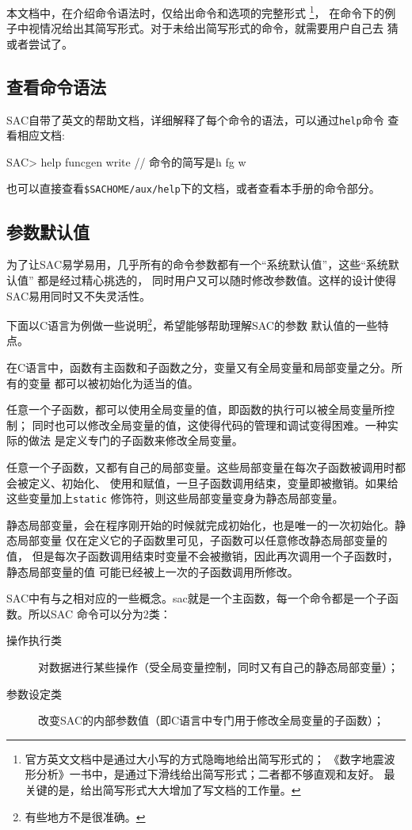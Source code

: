 本文档中，在介绍命令语法时，仅给出命令和选项的完整形式
\footnote{官方英文文档中是通过大小写的方式隐晦地给出简写形式的；
《数字地震波形分析》一书中，是通过下滑线给出简写形式；二者都不够直观和友好。
最关键的是，给出简写形式大大增加了写文档的工作量。}，
在命令下的例子中视情况给出其简写形式。对于未给出简写形式的命令，就需要用户自己去
猜或者尝试了。

\subsection{查看命令语法}
SAC自带了英文的帮助文档，详细解释了每个命令的语法，可以通过\lstinline{help}命令
查看相应文档:
\begin{SACCode}
SAC> help funcgen write   // 命令的简写是h fg w
\end{SACCode}
也可以直接查看\lstinline{$SACHOME/aux/help}下的文档，或者查看本手册的命令部分。

\subsection{参数默认值}
为了让SAC易学易用，几乎所有的命令参数都有一个``系统默认值''，这些``系统默认值''
都是经过精心挑选的，
同时用户又可以随时修改参数值。这样的设计使得SAC易用同时又不失灵活性。

下面以C语言为例做一些说明\footnote{有些地方不是很准确。}，希望能够帮助理解SAC的参数
默认值的一些特点。

在C语言中，函数有主函数和子函数之分，变量又有全局变量和局部变量之分。所有的变量
都可以被初始化为适当的值。

任意一个子函数，都可以使用全局变量的值，即函数的执行可以被全局变量所控制；
同时也可以修改全局变量的值，这使得代码的管理和调试变得困难。一种实际的做法
是定义专门的子函数来修改全局变量。

任意一个子函数，又都有自己的局部变量。这些局部变量在每次子函数被调用时都会被定义、初始化、
使用和赋值，一旦子函数调用结束，变量即被撤销。如果给这些变量加上\lstinline{static}
修饰符，则这些局部变量变身为静态局部变量。

静态局部变量，会在程序刚开始的时候就完成初始化，也是唯一的一次初始化。静态局部变量
仅在定义它的子函数里可见，子函数可以任意修改静态局部变量的值，
但是每次子函数调用结束时变量不会被撤销，因此再次调用一个子函数时，静态局部变量的值
可能已经被上一次的子函数调用所修改。

SAC中有与之相对应的一些概念。sac就是一个主函数，每一个命令都是一个子函数。所以SAC
命令可以分为2类：
\begin{description}
\item[操作执行类] 对数据进行某些操作（受全局变量控制，同时又有自己的静态局部变量）；
\item[参数设定类] 改变SAC的内部参数值（即C语言中专门用于修改全局变量的子函数）； 
\end{description}

